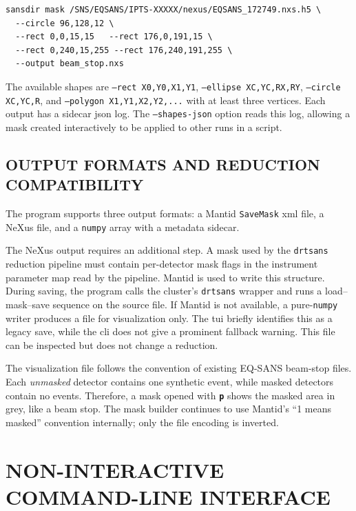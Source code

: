 \documentclass[tm]{ornltm}
\newcommand{\key}[1]{\textbf{\texttt{#1}}}
\begin{document}
\begin{lstlisting}[language=shellsession]
sansdir mask /SNS/EQSANS/IPTS-XXXXX/nexus/EQSANS_172749.nxs.h5 \
  --circle 96,128,12 \
  --rect 0,0,15,15   --rect 176,0,191,15 \
  --rect 0,240,15,255 --rect 176,240,191,255 \
  --output beam_stop.nxs
\end{lstlisting}

The available shapes are \texttt{--rect X0,Y0,X1,Y1}, \texttt{--ellipse
XC,YC,RX,RY}, \texttt{--circle XC,YC,R}, and \texttt{--polygon
X1,Y1,X2,Y2,...} with at least three vertices. Each output has a sidecar
\ac{json} log. The \texttt{--shapes-json} option reads this log, allowing a mask
created interactively to be applied to other runs in a script.

\subsection{OUTPUT FORMATS AND REDUCTION COMPATIBILITY}

The program supports three output formats: a Mantid \texttt{SaveMask} \ac{xml}
file, a NeXus file, and a \texttt{numpy} array with a metadata sidecar.

The NeXus output requires an additional step. A mask used by the
\texttt{drtsans} reduction pipeline must contain per-detector mask flags in the
instrument parameter map read by the pipeline. Mantid is used to write this
structure. During saving, the program calls the cluster's \texttt{drtsans}
wrapper and runs a load--mask--save sequence on the source file. If Mantid is not
available, a pure-\texttt{numpy} writer produces a file for visualization only.
The \ac{tui} briefly identifies this as a legacy save, while the \ac{cli} does
not give a prominent fallback warning. This file can be inspected but does not
change a reduction.

The visualization file follows the convention of existing EQ-SANS beam-stop
files. Each \emph{unmasked} detector contains one synthetic event, while masked
detectors contain no events. Therefore, a mask opened with \key{p} shows the
masked area in grey, like a beam stop. The mask builder continues to use
Mantid's ``1 means masked'' convention internally; only the file encoding is
inverted.

\section{NON-INTERACTIVE COMMAND-LINE INTERFACE}
\label{sec:cli}
\end{document}
